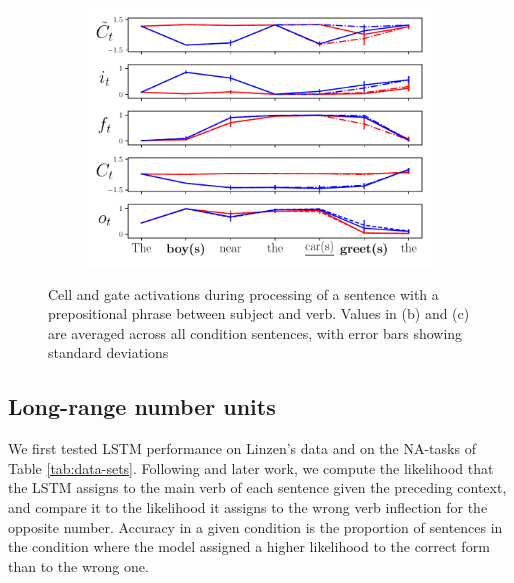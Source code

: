 \begin{figure}[ht]
\begin{subfigure}{0.32\textwidth}
    \label{fig:singular-unit}
    \end{subfigure}
    \begin{subfigure}{0.32\textwidth}
            \centering
            \includegraphics[width=\linewidth]{Figures/nounpp_775.pdf}
    \label{fig:plural-unit}
    \end{subfigure}
\caption{Cell and gate activations during processing of a sentence with a prepositional phrase between subject and verb. Values in (b) and (c) are averaged across all condition sentences, with error bars showing standard deviations}
\end{figure}

\subsection{Long-range number units}\label{subsec:ablation}
We first tested LSTM performance on Linzen's data and on the NA-tasks of Table
\ref{tab:data-sets}. Following
 and later work, we compute the likelihood
that the LSTM assigns to the main verb of each sentence given the
preceding context, and compare it to the likelihood it assigns to the
wrong verb inflection for the opposite number. Accuracy in a given condition is the proportion of sentences
in the condition where the model assigned a higher likelihood to the
correct form than to the wrong one.

